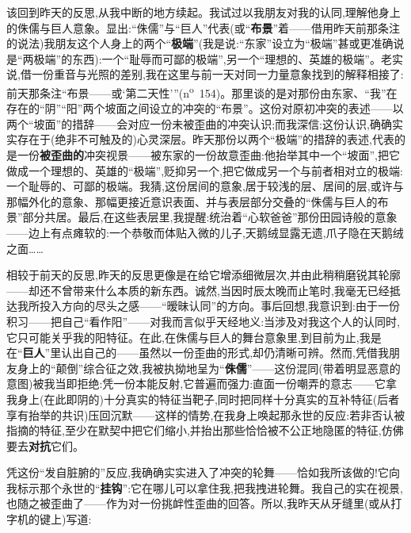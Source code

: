 该回到昨天的反思,从我中断的地方续起。我试过以我朋友对我的认同,理解他身上的侏儒与巨人意象。显出:“侏儒”与“巨人”代表(或“\textbf{布景}”着——借用昨天前那条注的说法)我朋友这个人身上的两个“\textbf{极端}”(我是说:“东家”设立为“极端”甚或更准确说是“两极端”的东西):一个“耻辱而可鄙的极端”,另一个“理想的、英雄的极端”。老实说,借一份重音与光照的差别,我在这里与前一天对同一力量意象找到的解释相接了:前天那条注“布景——或‘第二天性’”(n\textsuperscript{o}~154)。那里谈的是对那份由东家、“我”在存在的“阴”“阳”两个坡面之间设立的冲突的“布景”。这份对原初冲突的表述——以两个“坡面”的措辞——会对应一份未被歪曲的冲突认识;而我深信:这份认识,确确实实存在于(绝非不可触及的)心灵深层。昨天那份以两个“极端”的措辞的表述,代表的是一份\textbf{被歪曲的}冲突视景——被东家的一份故意歪曲:他抬举其中一个“坡面”\dmark{},把它做成一个理想的、英雄的“极端”,贬抑另一个,把它做成另一个与前者相对立的极端:一个耻辱的、可鄙的极端。我猜,这份居间的意象,居于较浅的层、居间的层,或许与那幅外化的意象、那幅更接近意识表面、并与表层部分交叠的“侏儒与巨人的布景”部分共居。最后,在这些表层里,我提醒:统治着“心软爸爸”那份田园诗般的意象——边上有点瘫软的:一个恭敬而体贴入微的儿子,天鹅绒显露无遗,爪子隐在天鹅绒之面……

相较于前天的反思,昨天的反思更像是在给它增添细微层次,并由此稍稍磨锐其轮廓——却还不曾带来什么本质的新东西。诚然,当因时辰太晚而止笔时,我毫无已经抵达我所投入方向的尽头之感——“暧昧认同”的方向。事后回想,我意识到:由于一份积习——把自己“看作阳”——对我而言似乎天经地义:当涉及对我这个人的认同时,它只可能关乎我的阳特征。在此,在侏儒与巨人的舞台意象里,到目前为止,我是在“\textbf{巨人}”里认出自己的——虽然以一份歪曲的形式,却仍清晰可辨。然而,凭借我朋友身上的“颠倒”综合征之效,我被执拗地呈为“\textbf{侏儒}”——这份混同(带着明显恶意的意图)被我当即拒绝:凭一份本能反射,它普遍而强力:直面一份嘲弄的意志——它拿我身上(在此即阴的)十分真实的特征当靶子,同时把同样十分真实的互补特征(后者享有抬举的共识)压回沉默——这样的情势,在我身上唤起那永世的反应:若非否认被指摘的特征,至少在默契中把它们缩小,并抬出那些恰恰被不公正地隐匿的特征,仿佛要去\textbf{对抗}它们。

凭这份“发自脏腑的”反应,我确确实实进入了冲突的轮舞——恰如我所该做的!它向我标示那个永世的“\textbf{挂钩}”:它在哪儿可以拿住我,把我拽进轮舞\dmark{}。我自己的实在视景,也随之被歪曲了——作为对一份挑衅性歪曲的回答。所以,我昨天从牙缝里(或从打字机的键上)写道:

